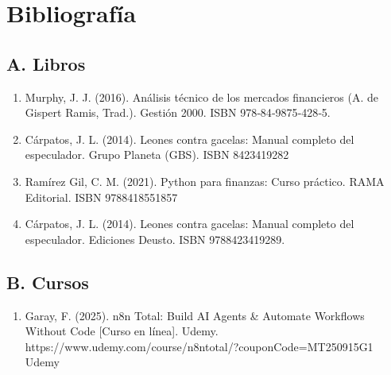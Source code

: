 \documentclass[letterpaper,10pt,spanish]{sphinxmanual}
\begin{document}
\sphinxstepscope


\chapter{Bibliografía}
\label{\detokenize{Bibliografia:bibliografia}}\label{\detokenize{Bibliografia::doc}}

\section{A.  Libros}
\label{\detokenize{Bibliografia:a-libros}}\begin{enumerate}
%
\item {} 
\sphinxAtStartPar
Murphy, J. J. (2016). Análisis técnico de los mercados financieros (A. de Gispert Ramis, Trad.). Gestión 2000. ISBN 978‐84‐9875‐428‐5.

\item {} 
\sphinxAtStartPar
Cárpatos, J. L. (2014). Leones contra gacelas: Manual completo del especulador. Grupo Planeta (GBS). ISBN 8423419282

\item {} 
\sphinxAtStartPar
Ramírez Gil, C. M. (2021). Python para finanzas: Curso práctico. RA\sphinxhyphen{}MA Editorial. ISBN 978\sphinxhyphen{}84\sphinxhyphen{}18551\sphinxhyphen{}85\sphinxhyphen{}7

\item {} 
\sphinxAtStartPar
Cárpatos, J. L. (2014). Leones contra gacelas: Manual completo del especulador. Ediciones Deusto. ISBN 978\sphinxhyphen{}84\sphinxhyphen{}234\sphinxhyphen{}1928\sphinxhyphen{}9.

\end{enumerate}


\section{B. Cursos}
\label{\detokenize{Bibliografia:b-cursos}}\begin{enumerate}
%
\item {} 
\sphinxAtStartPar
Garay, F. (2025). n8n Total: Build AI Agents \& Automate Workflows Without Code {[}Curso en línea{]}. Udemy. https://www.udemy.com/course/n8n\sphinxhyphen{}total/?couponCode=MT250915G1
Udemy

\end{enumerate}
\end{document}
